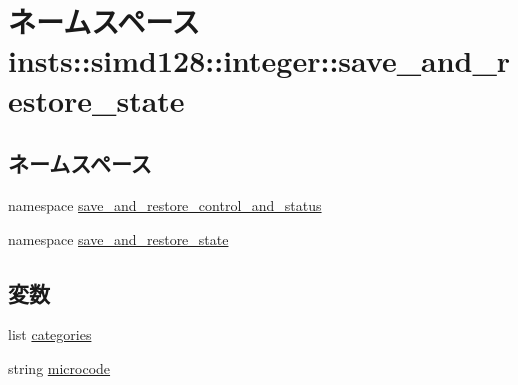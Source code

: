 \hypertarget{namespaceinsts_1_1simd128_1_1integer_1_1save__and__restore__state}{
\section{ネームスペース insts::simd128::integer::save\_\-and\_\-restore\_\-state}
\label{namespaceinsts_1_1simd128_1_1integer_1_1save__and__restore__state}
}
\subsection*{ネームスペース}
\begin{DoxyCompactItemize}
\item 
namespace \hyperlink{namespaceinsts_1_1simd128_1_1integer_1_1save__and__restore__state_1_1save__and__restore__control__and__status}{save\_\-and\_\-restore\_\-control\_\-and\_\-status}
\item 
namespace \hyperlink{namespaceinsts_1_1simd128_1_1integer_1_1save__and__restore__state_1_1save__and__restore__state}{save\_\-and\_\-restore\_\-state}
\end{DoxyCompactItemize}
\subsection*{変数}
\begin{DoxyCompactItemize}
\item 
list \hyperlink{namespaceinsts_1_1simd128_1_1integer_1_1save__and__restore__state_a273cf0f1630af14c1582f05e53354a55}{categories}
\item 
string \hyperlink{namespaceinsts_1_1simd128_1_1integer_1_1save__and__restore__state_a770f11a173e99389a8802f0107ed8f52}{microcode}
\end{DoxyCompactItemize}


